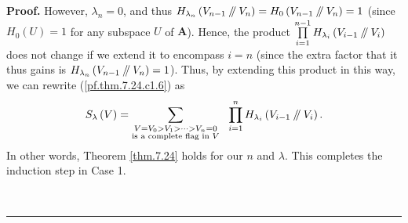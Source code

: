 \documentclass[numbers=enddot,12pt,final,onecolumn,notitlepage]{scrartcl}%
\numberwithin{exer}{section}
\theoremstyle{definition}
\newenvironment{proof}[1][Proof]{\noindent\textbf{#1.} }{\ \rule{0.5em}{0.5em}}
\let\sumnonlimits\sum
\let\prodnonlimits\prod
\renewcommand{\sum}{\sumnonlimits\limits}
\renewcommand{\prod}{\prodnonlimits\limits}
\newcommand{\sslash}{\mathbin{/\mkern-5mu/}}
\theoremstyle{plainsl}
\begin{document}
\begin{proof}
However, $\lambda_{n}=0$, and thus $H_{\lambda_{n}}\left(  V_{n-1}%
\sslash V_{n}\right)  =H_{0}\left(  V_{n-1}\sslash V_{n}\right)  =1$ (since
$H_{0}\left(  U\right)  =1$ for any subspace $U$ of $\mathbf{A}$). Hence, the
product $\prod_{i=1}^{n-1}H_{\lambda_{i}}\left(  V_{i-1}\sslash V_{i}\right)
$ does not change if we extend it to encompass $i=n$ (since the extra factor
that it thus gains is $H_{\lambda_{n}}\left(  V_{n-1}\sslash V_{n}\right)
=1$). Thus, by extending this product in this way, we can rewrite
(\ref{pf.thm.7.24.c1.6}) as%
\[
S_{\lambda}\left(  V\right)  =\sum_{\substack{V=V_{0}>V_{1}>\cdots
>V_{n}=0\\\text{is a complete flag in }V}}\ \ \prod_{i=1}^{n}H_{\lambda_{i}%
}\left(  V_{i-1}\sslash V_{i}\right)  .
\]
In other words, Theorem \ref{thm.7.24} holds for our $n$ and $\lambda$. This
completes the induction step in Case 1.


\end{proof}
\end{document}
